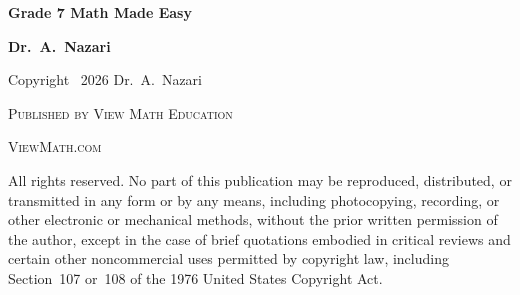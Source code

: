 %
%
%   
%

\providecommand{\VMBookTitle}{Grade 7 Math Made Easy}
\providecommand{\VMBookSubtitle}{}

\thispagestyle{empty}


\begin{center}
    {\fontsize{26}{32}\selectfont\bfseries \VMBookTitle\par}
\end{center}

\ifx\VMBookSubtitle\empty\else
    \vspace{6mm}
    \begin{center}
        {\large\itshape \VMBookSubtitle\par}
    \end{center}
\fi

\vspace{16mm}

\begin{center}
    {\Large\bfseries Dr.\ A.\ Nazari\par}
\end{center}


\noindent Copyright \textcopyright\ 2026 Dr.\ A.\ Nazari

\medskip

\noindent \textsc{Published by View Math Education}

\noindent \textsc{ViewMath.com}

\medskip

\noindent\small All rights reserved. No part of this publication may be
reproduced, distributed, or transmitted in any form or by any means,
including photocopying, recording, or other electronic or mechanical
methods, without the prior written permission of the author, except in the
case of brief quotations embodied in critical reviews and certain other
noncommercial uses permitted by copyright law, including Section~107 or~108
of the 1976 United States Copyright Act.

